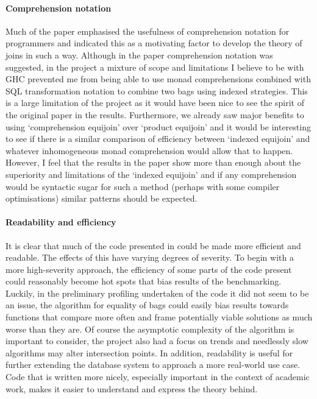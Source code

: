 \paragraph{Comprehension notation} Much of the paper \relalg{} emphasised the
usefulness of comprehension notation for programmers and indicated this as a
motivating factor to develop the theory of joins in such a way. Although in the
paper comprehension notation was suggested, in the project a mixture of scope
and limitations I believe to be with GHC prevented me from being able to use
monad comprehensions combined with SQL transformation notation to combine two
bags using indexed strategies. This is a large limitation of the project as it
would have been nice to see the spirit of the original paper in the results.
Furthermore, we already saw major benefits to using `comprehension equijoin'
over `product equijoin' and it would be interesting to see if there is a similar
comparison of efficiency between `indexed equijoin' and whatever inhomogeneous
monad comprehension would allow that to happen. However, I feel that the results
in the paper show more than enough about the superiority and limitations of the
`indexed equijoin' and if any comprehension would be syntactic sugar for such a
method (perhaps with some compiler optimisations) similar patterns should be
expected.

\paragraph{Readability and efficiency} It is clear that much of the code
presented in  could be made more efficient and
readable. The effects of this have varying degrees of severity. To begin with a
more high-severity approach, the efficiency of some parts of the code present
could reasonably become hot spots that bias results of the benchmarking.
Luckily, in the preliminary profiling undertaken of the code it did not seem to
be an issue, the algorithm for equality of bags could easily bias results
towards
functions that compare more often and frame potentially viable solutions as much
worse than they are. Of course the asymptotic complexity of the algorithm is
important to consider, the project also had a focus on trends and needlessly
slow algorithms may alter intersection points. In addition, readability is useful for further extending the
database system to approach a more real-world use case. Code that
is written more nicely, especially important in the context of academic work,
makes it easier to understand and express the theory behind.
